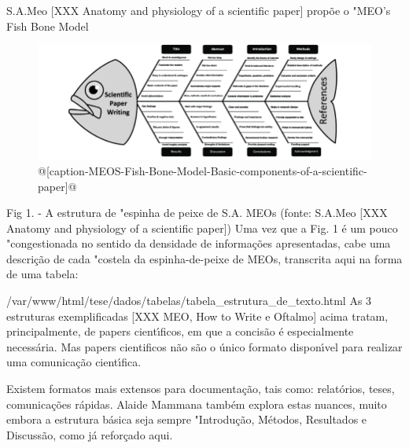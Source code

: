 \documentclass[
12pt,		%
openright,	%
twoside,  %
a4paper,			%
chapter=TITLE,		%
english,			%
french,				%
spanish,			%
brazil				%
]{USPSC-classe/USPSC}
\begin{document}
S.A.Meo [XXX Anatomy and physiology of a scientific paper] prop\~oe o "MEO’s Fish Bone Model


\begin{figure}[htb]

	\begin{center}

		\includegraphics[scale=0.5]{../../imagens/MEOS-Fish-Bone-Model-Basic-components-of-a-scientific-paper.png}

	\end{center}

	\caption{\label{MEOS-Fish-Bone-Model-Basic-components-of-a-scientific-paper}@[caption-MEOS-Fish-Bone-Model-Basic-components-of-a-scientific-paper]@}


\end{figure}
Fig 1. - A estrutura de "espinha de peixe de S.A. MEOs (fonte: S.A.Meo [XXX Anatomy and physiology of a scientific paper])
Uma vez que a Fig. 1 \'e um pouco "congestionada no sentido da densidade de informa\c{c}\~oes apresentadas, cabe uma descri\c{c}\~ao de cada "costela da espinha-de-peixe de MEOs, transcrita aqui na forma de uma tabela:




/var/www/html/tese/dados/tabelas/tabela\_estrutura\_de\_texto.html
As 3 estruturas exemplificadas [XXX MEO, How to Write e Oftalmo] acima tratam, principalmente, de papers cient\'{\i}ficos, em que a concis\~ao \'e especialmente necess\'aria. Mas papers cientificos n\~ao s\~ao o \'unico formato dispon\'{\i}vel para realizar uma comunica\c{c}\~ao cient\'{\i}fica. 




Existem formatos mais extensos para documenta\c{c}\~ao, tais como: relat\'orios, teses, comunica\c{c}\~oes r\'apidas. Alaide Mammana tamb\'em explora estas nuances, muito embora a estrutura b\'asica seja sempre "Introdu\c{c}\~ao, M\'etodos, Resultados e Discuss\~ao, como j\'a refor\c{c}ado aqui.
\end{document}
